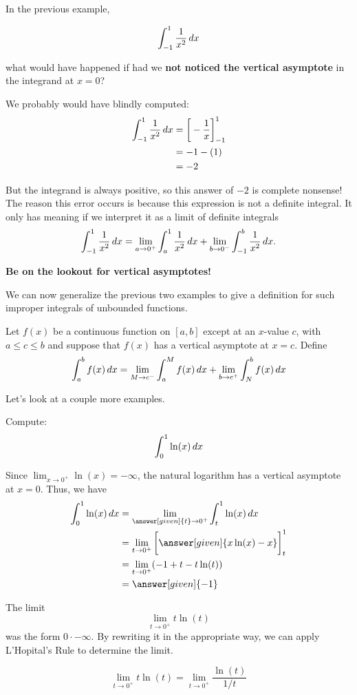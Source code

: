 \documentclass{ximera}
\begin{document}
\begin{warning}
In the previous example,

\[
\int_{-1}^{1} \frac{1}{x^2} \mathop{}\!d x
\]

 what would have happened if had we \textbf{not
  noticed the vertical asymptote} in the integrand at $x=0$?

We probably would have blindly computed:
\begin{align*}
  \int_{-1}^1\frac1{x^2}\mathop{}\!d x &= \bigg[ -\frac{1}{x} \bigg]_{-1}^1\\
  &= -1 - (1)\\
  &=-2
\end{align*}

But the integrand is always positive, so this answer of $-2$ is
complete nonsense! The reason this error occurs is because this expression is not a definite integral. It only has meaning if we
interpret it as a limit of definite integrals
\[
 \int_{-1}^1 \frac{1}{x^2} \mathop{}\!d x = \lim_{a \to 0^+} \int_{a}^1 \frac{1}{x^2} \mathop{}\!d x  + \lim_{b \to 0^-} \int_{-1}^{b} \frac{1}{x^2} \mathop{}\!d x.
\]


\textbf{Be on the lookout for vertical asymptotes!}
\end{warning}


We can now generalize the previous two examples to give a definition for such
improper integrals of unbounded functions.

\begin{definition}
Let $f(x)$ be a continuous function on $[a,b]$ except at an $x$-value $c$, with $a\leq
c\leq b$ and suppose that $f(x)$ has a vertical asymptote at $x=c$. Define
\[
\int_a^b f(x)\mathop{}\!d x = \lim_{M\to c^-}\int_a^M f(x)\mathop{}\!d x + \lim_{b\to c^+}\int_N^b f(x)\mathop{}\!d x
\]
\end{definition}

Let's look at a couple more examples.


\begin{example}
  Compute:
  \[
  \int_0^1 \ln(x)\mathop{}\!d x
  \]
  \begin{explanation}
    Since $\lim_{x\to 0^+} \ln(x) = -\infty$, the natural logarithm
    has a vertical asymptote at $x = 0$. Thus, we have
    \begin{align*}
    \int_0^1 \ln(x) \d x &=\lim_{\answer[given]{t}\to 0^+} \int_t^1 \ln(x) \d x \\
    &= \lim_{t\to 0^+} \eval{\answer[given]{x \ln(x)-x}}_t^1 \\
    &=\lim_{t \to 0^{+}} ( -1 + t - t\ln(t) ) \\
&=\answer[given]{ -1}
      \end{align*}
\begin{hint}
The limit
\[
\lim_{t \to 0^{+}} t\ln(t)
\]
was the form $0\cdot -\infty$. By rewriting it in the appropriate way, we can apply L'Hopital's Rule to
determine the limit.

\[
\lim_{t \to 0^{+}} t\ln(t) =\lim_{t \to 0^{+}} \frac{\ln(t)}{1/t}
\]
\end{hint}
  \end{explanation}
\end{example}
\end{document}
